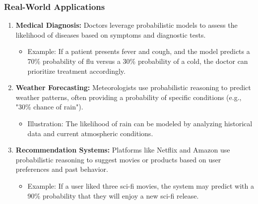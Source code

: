 \documentclass[aspectratio=169]{beamer}
\begin{document}
\begin{frame}[fragile]
    \frametitle{Real-World Applications}
    \begin{enumerate}
        \item \textbf{Medical Diagnosis:} 
            Doctors leverage probabilistic models to assess the likelihood of diseases based on symptoms and diagnostic tests. 
            \begin{itemize}
                \item Example: If a patient presents fever and cough, and the model predicts a 70\% probability of flu versus a 30\% probability of a cold, the doctor can prioritize treatment accordingly.
            \end{itemize}
        
        \item \textbf{Weather Forecasting:} 
            Meteorologists use probabilistic reasoning to predict weather patterns, often providing a probability of specific conditions (e.g., "30\% chance of rain").
            \begin{itemize}
                \item Illustration: The likelihood of rain can be modeled by analyzing historical data and current atmospheric conditions.
            \end{itemize}
        
        \item \textbf{Recommendation Systems:}
            Platforms like Netflix and Amazon use probabilistic reasoning to suggest movies or products based on user preferences and past behavior.
            \begin{itemize}
                \item Example: If a user liked three sci-fi movies, the system may predict with a 90\% probability that they will enjoy a new sci-fi release.
            \end{itemize}
    \end{enumerate}
\end{frame}
\end{document}
